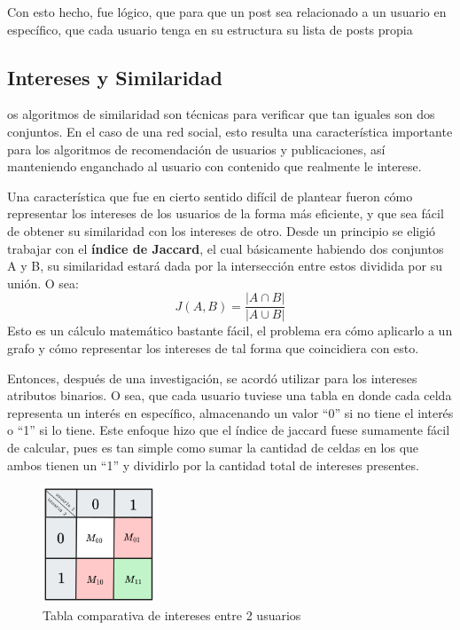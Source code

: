 \documentclass[9pt,letterpaper,onecolumn]{rho-class/rho}
\begin{document}
	Con esto hecho, fue lógico, que para que un post sea relacionado a un usuario en específico, que cada usuario tenga en su estructura su lista de posts propia

\subsection{Intereses y Similaridad}
	os algoritmos de similaridad son técnicas para verificar que tan iguales son dos conjuntos. En el caso de una red social, esto resulta una característica importante para los algoritmos de recomendación de usuarios y publicaciones, así manteniendo enganchado al usuario con contenido que realmente le interese.

	Una característica que fue en cierto sentido difícil de plantear fueron cómo representar los intereses de los usuarios de la forma más eficiente, y que sea fácil de obtener su similaridad con los intereses de otro. 
	Desde un principio se eligió trabajar con el \textbf{índice de Jaccard}, el cual básicamente habiendo dos conjuntos A y B, su similaridad estará dada por la intersección entre estos dividida por su unión. O sea:
    \begin{equation}
        \label{eq:jaccard}
        J(A,B) = \frac{|A \cap B|}{|A \cup B|}
    \end{equation}
    Esto es un cálculo matemático bastante fácil, el problema era cómo aplicarlo a un grafo y cómo representar los intereses de tal forma que coincidiera con esto.

    \vspace{0.5cm}
	
	Entonces, después de una investigación, se acordó utilizar para los intereses atributos binarios. O sea, que cada usuario tuviese una tabla en donde cada celda representa un interés en específico, almacenando un valor “0” si no tiene el interés o “1” si lo tiene. Este enfoque hizo que el índice de jaccard fuese sumamente fácil de calcular, pues es tan simple como sumar la cantidad de celdas en los que ambos tienen un “1” y dividirlo por la cantidad total de intereses presentes. 

    \begin{figure}[H]
        \centering
        \includegraphics[width=0.3\textwidth]{figures/tablas_intereses.png}
        \caption{Tabla comparativa de intereses entre 2 usuarios}
        \label{fig:tablas_intereses}
    \end{figure}
\end{document}
